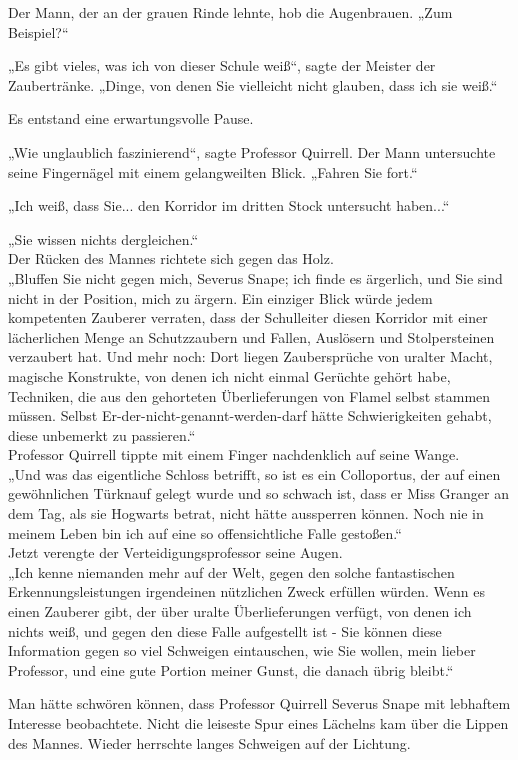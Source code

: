 {Der Mann, der an der grauen Rinde lehnte, hob die Augenbrauen. „Zum Beispiel?“

„Es gibt vieles, was ich von dieser Schule weiß“, sagte der Meister der Zaubertränke. „Dinge, von denen Sie vielleicht nicht glauben, dass ich sie weiß.“

Es entstand eine erwartungsvolle Pause.

„Wie unglaublich faszinierend“, sagte Professor Quirrell. Der Mann untersuchte seine Fingernägel mit einem gelangweilten Blick. „Fahren Sie fort.“

„Ich weiß, dass Sie... den Korridor im dritten Stock untersucht haben...“

„Sie wissen nichts dergleichen.“\\ Der Rücken des Mannes richtete sich gegen das Holz.\\ „Bluffen Sie nicht gegen mich, Severus Snape; ich finde es ärgerlich, und Sie sind nicht in der Position, mich zu ärgern. Ein einziger Blick würde jedem kompetenten Zauberer verraten, dass der Schulleiter diesen Korridor mit einer lächerlichen Menge an Schutzzaubern und Fallen, Auslösern und Stolpersteinen verzaubert hat. Und mehr noch: Dort liegen Zaubersprüche von uralter Macht, magische Konstrukte, von denen ich nicht einmal Gerüchte gehört habe, Techniken, die aus den gehorteten Überlieferungen von Flamel selbst stammen müssen. Selbst Er-der-nicht-genannt-werden-darf hätte Schwierigkeiten gehabt, diese unbemerkt zu passieren.“\\ Professor Quirrell tippte mit einem Finger nachdenklich auf seine Wange.\\ „Und was das eigentliche Schloss betrifft, so ist es ein Colloportus, der auf einen gewöhnlichen Türknauf gelegt wurde und so schwach ist, dass er Miss Granger an dem Tag, als sie Hogwarts betrat, nicht hätte aussperren können. Noch nie in meinem Leben bin ich auf eine so offensichtliche Falle gestoßen.“\\ Jetzt verengte der Verteidigungsprofessor seine Augen.\\ „Ich kenne niemanden mehr auf der Welt, gegen den solche fantastischen Erkennungsleistungen irgendeinen nützlichen Zweck erfüllen würden. Wenn es einen Zauberer gibt, der über uralte Überlieferungen verfügt, von denen ich nichts weiß, und gegen den diese Falle aufgestellt ist - Sie können diese Information gegen so viel Schweigen eintauschen, wie Sie wollen, mein lieber Professor, und eine gute Portion meiner Gunst, die danach übrig bleibt.“

Man hätte schwören können, dass Professor Quirrell Severus Snape mit lebhaftem Interesse beobachtete. Nicht die leiseste Spur eines Lächelns kam über die Lippen des Mannes. Wieder herrschte langes Schweigen auf der Lichtung.

}
